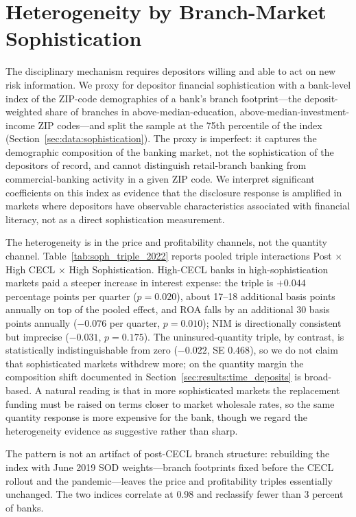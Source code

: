 \section{Heterogeneity by Branch-Market Sophistication}
\label{sec:heterogeneity}
\label{sec:results:sophistication}
\label{sec:results:heterogeneity}

The disciplinary mechanism requires depositors willing and able to act
on new risk information.  We proxy for depositor financial
sophistication with a bank-level index of the ZIP-code demographics of
a bank's branch footprint---the deposit-weighted share of branches in
above-median-education, above-median-investment-income ZIP codes---and
split the sample at the 75th percentile of the index
(Section~\ref{sec:data:sophistication}).  The proxy is imperfect: it
captures the demographic composition of the banking market, not the
sophistication of the depositors of record, and cannot distinguish
retail-branch banking from commercial-banking activity in a given
ZIP code.  We interpret significant coefficients on this index as
evidence that the disclosure response is amplified in markets where
depositors have observable characteristics associated with financial
literacy, not as a direct sophistication measurement.

The heterogeneity is in the price and profitability channels, not the
quantity channel.  Table~\ref{tab:soph_triple_2022} reports pooled
triple interactions Post $\times$ High CECL $\times$ High
Sophistication.  High-CECL banks in high-sophistication markets paid a
steeper increase in interest expense: the triple is $+0.044$ percentage
points per quarter ($p=0.020$), about 17--18 additional basis points
annually on top of the pooled effect, and ROA falls by an additional 30
basis points annually ($-0.076$ per quarter, $p=0.010$); NIM is
directionally consistent but imprecise ($-0.031$, $p=0.175$).  The
uninsured-quantity triple, by contrast, is statistically
indistinguishable from zero ($-0.022$, SE $0.468$), so we do not claim
that sophisticated markets withdrew more; on the quantity margin the
composition shift documented in Section~\ref{sec:results:time_deposits}
is broad-based.  A natural reading is that in more sophisticated
markets the replacement funding must be raised on terms closer to
market wholesale rates, so the same quantity response is more expensive
for the bank, though we regard the heterogeneity evidence as
suggestive rather than sharp.

The pattern is not an artifact of post-CECL branch structure:
rebuilding the index with June 2019 SOD weights---branch footprints
fixed before the CECL rollout and the pandemic---leaves the price and
profitability triples essentially unchanged.  The two indices correlate
at 0.98 and reclassify fewer than 3 percent of banks.
